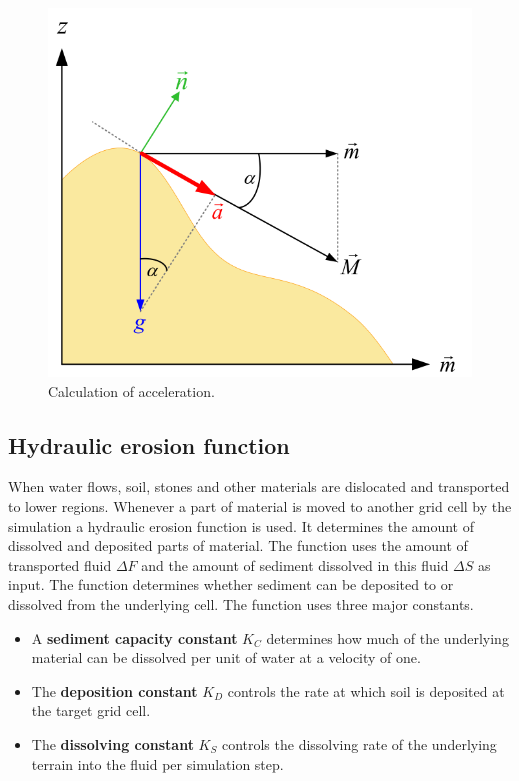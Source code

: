 \begin{figure}[htb]
	\centering
	\includegraphics[width=.8\linewidth]{NWD05/acceleration}
	\caption{Calculation of acceleration.}
	\label{fig:calc_acceleration}
\end{figure}

\subsection{Hydraulic erosion function}
When water flows, soil, stones and other materials are dislocated and transported to lower regions. Whenever a part of material is moved to another grid cell by the simulation a hydraulic erosion function is used. It determines the amount of dissolved and deposited parts of material. The function uses the amount of transported fluid $\Delta F$ and the amount of sediment dissolved in this fluid $\Delta S$ as input. The function determines whether sediment can be deposited to or dissolved from the underlying cell. The function uses three major constants. 
\begin{itemize}
\item A \textbf{sediment capacity constant} $K_C$ determines how much of the underlying material can be dissolved per unit of water at a velocity of one. 
\item The \textbf{deposition constant} $K_D$ controls the rate at which soil is deposited at the target grid cell. 
\item The \textbf{dissolving constant} $K_S$ controls the dissolving rate of the underlying terrain into the fluid per simulation step.
\end{itemize}

